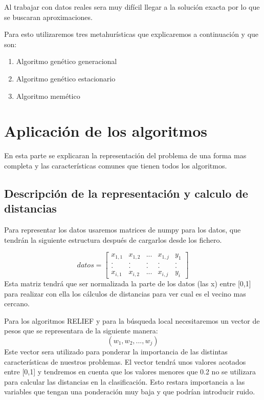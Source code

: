 \documentclass[titlepage]{article}
\begin{document}
	Al trabajar con datos reales sera muy difícil llegar a la solución exacta por lo que se buscaran aproximaciones.
	
	Para esto utilizaremos tres metahurísticas que explicaremos a continuación y que son:
	\begin{enumerate}
		\item Algoritmo genético generacional
		\item Algoritmo genético estacionario
		\item Algoritmo memético
	\end{enumerate}
	\newpage
	
	\section{Aplicación de los algoritmos }
	 En esta parte se explicaran la representación del problema de una forma mas completa y las características comunes que tienen todos los algoritmos.
	 
	 \subsection{Descripción de la representación y calculo de distancias}
	 
	 Para representar los datos usaremos matrices de numpy para los datos, que tendrán la siguiente estructura después de cargarlos desde los fichero.
	
	\[
	datos =
	\begin{bmatrix}
	x_{1,1} & x_{1,2} & ... & x_{1,j} & y_1 \\
	. & . & . & . & . \\
	. & . & . & . & .\\
	x_{i,1} & x_{i,2} & ... & x_{i,j} & y_i
	\end{bmatrix}
	\]
	Esta matriz tendrá que ser normalizada la parte de los datos (las x) entre [0,1] para realizar con ella los cálculos de distancias para ver cual es el vecino mas cercano.
	
	Para los algoritmos RELIEF y para la búsqueda local necesitaremos un vector de pesos que se representara de la siguiente manera:
	$$
		(w_1, w_2, ..., w_j)
	$$
	Este vector sera utilizado para ponderar la importancia de las distintas características de nuestros problemas. El vector tendrá unos valores acotados entre [0,1] y tendremos en cuenta que los valores menores que 0.2 no se utilizara para calcular las distancias en la clasificación. Esto restara importancia a las variables que tengan una ponderación muy baja y que podrían introducir ruido.
	\newline
	
\end{document}
